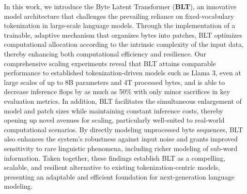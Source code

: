 In this work, we introduce the Byte Latent Transformer (\textbf{BLT}), an innovative model architecture that challenges the prevailing reliance on fixed-vocabulary tokenization in large-scale language models. Through the implementation of a trainable, adaptive mechanism that organizes bytes into patches, {\textsc BLT} optimizes computational allocation according to the intrinsic complexity of the input data, thereby enhancing both computational efficiency and resilience. Our comprehensive scaling experiments reveal that {\textsc BLT} attains comparable performance to established tokenization-driven models such as Llama 3, even at large scales of up to 8B parameters and 4T processed bytes, and is able to decrease inference flops by as much as 50\% with only minor sacrifices in key evaluation metrics. In addition, {\textsc BLT} facilitates the simultaneous enlargement of model and patch sizes while maintaining constant inference costs, thereby opening up novel avenues for scaling, particularly well-suited to real-world computational scenarios. By directly modeling unprocessed byte sequences, {\textsc BLT} also enhances the system's robustness against input noise and grants improved sensitivity to rare linguistic phenomena, including richer modeling of sub-word information. Taken together, these findings establish {\textsc BLT} as a compelling, scalable, and resilient alternative to existing tokenization-centric models, presenting an adaptable and efficient foundation for next-generation language modeling.

